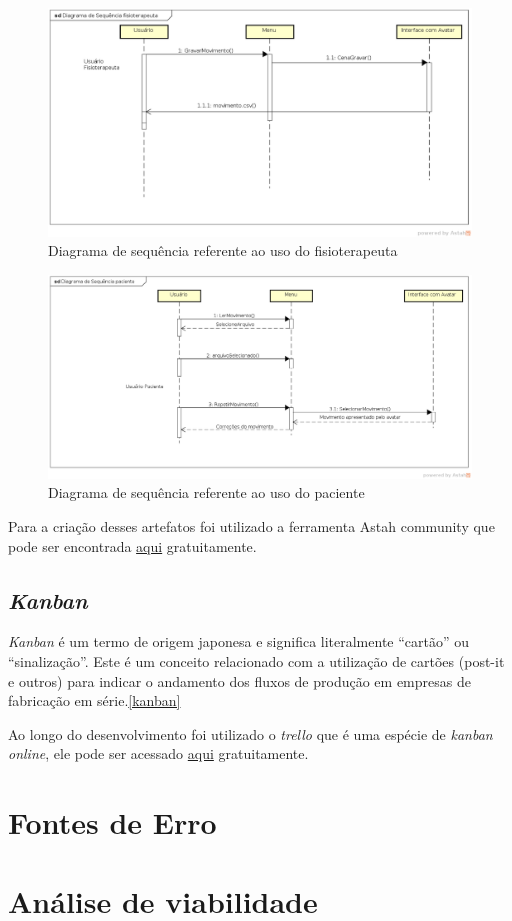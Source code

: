 \begin{figure}[!h]
\centering
\includegraphics [keepaspectratio=true,scale=0.45]{figuras/diagramaFisio.eps}

\caption{Diagrama de sequência referente ao uso do fisioterapeuta}
\label{diagramaFisio}
\end{figure}


\begin{figure}[!h]
\centering
\includegraphics [keepaspectratio=true,scale=0.45]{figuras/diagramaPaciente.eps}

\caption{Diagrama de sequência referente ao uso do paciente}
\label{diagramaPaciente}
\end{figure}

  Para a criação desses artefatos foi utilizado a ferramenta Astah community que pode ser encontrada \href{http://astah.net/download#community}{aqui} gratuitamente.


\subsection{\textit{Kanban}}\label{sub:kanban}
  \textit{Kanban} é um termo de origem japonesa e significa literalmente “cartão” ou “sinalização”.
Este é um conceito relacionado com a utilização de cartões (post-it e outros) para indicar o andamento dos fluxos de produção em empresas de fabricação em série.\ref{kanban}

  Ao longo do desenvolvimento foi utilizado o \textit{trello}  que é uma espécie de \textit{kanban online}, ele pode ser acessado \href{https://trello.com/}{aqui} gratuitamente.

\section{Fontes de Erro}\label{sol:fontesErro}
\section{Análise de viabilidade}\label{sol:viabilidade}
